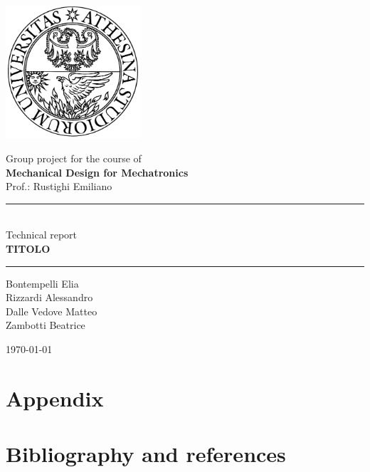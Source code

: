 \documentclass[11pt,a4paper]{article}
\begin{document}
	
	\thispagestyle{empty}
	\begin{center}
		\includegraphics[width=5cm]{logouni}
		\vspace{2cm}
		
		{\Large Group project for the course of \\ \vspace{3mm}
		\textbf{Mechanical Design for Mechatronics} \\ \vspace{1cm}
		Prof.: Rustighi Emiliano} \vspace{1cm}
	
		\rule{5cm}{0.5pt} \\ \vspace{1cm}
		{\Large Technical report} \\ \vspace{3mm}
		{\LARGE \textbf{TITOLO}} \\ \vspace{1cm}
		
		\rule{5cm}{0.5pt} \vspace{1cm}
		
		\begin{multicols}{2}
			Bontempelli Elia \\
			Rizzardi Alessandro \\
			Dalle Vedove Matteo \\
			Zambotti Beatrice
		\end{multicols}
		\vspace{1cm}
		
		\today
		
	\end{center}
	
	\newpage
	\tableofcontents
	
	\newpage
	
	\setcounter{page}{1}
	
	
	
	
	
	
	
	
	
	\appendix	
	
	
	
	\newpage
	\section{Appendix}
	\newpage
	\section{Bibliography and references}
	\printbibliography[heading=none]
	
	\newpage
	
\end{document}
